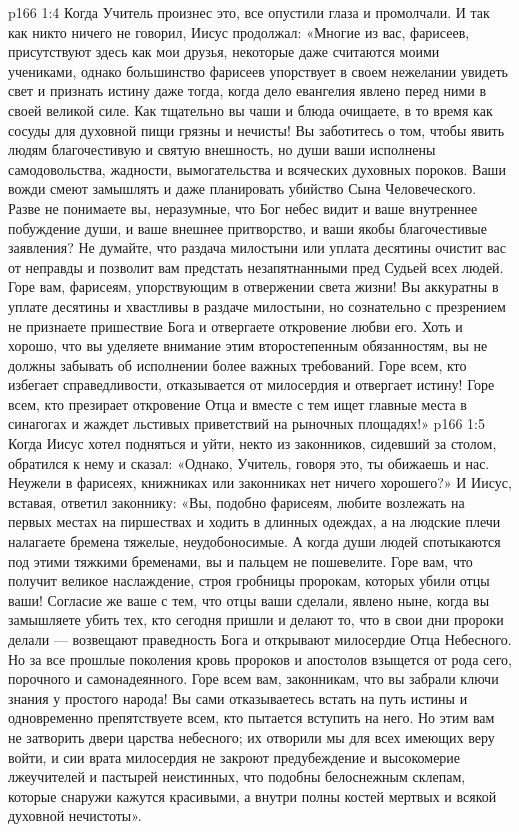 \vs p166 1:4 Когда Учитель произнес это, все опустили глаза и промолчали. И так как никто ничего не говорил, Иисус продолжал: «Многие из вас, фарисеев, присутствуют здесь как мои друзья, некоторые даже считаются моими учениками, однако большинство фарисеев упорствует в своем нежелании увидеть свет и признать истину даже тогда, когда дело евангелия явлено перед ними в своей великой силе. Как тщательно вы чаши и блюда очищаете, в то время как сосуды для духовной пищи грязны и нечисты! Вы заботитесь о том, чтобы явить людям благочестивую и святую внешность, но души ваши исполнены самодовольства, жадности, вымогательства и всяческих духовных пороков. Ваши вожди смеют замышлять и даже планировать убийство Сына Человеческого. Разве не понимаете вы, неразумные, что Бог небес видит и ваше внутреннее побуждение души, и ваше внешнее притворство, и ваши якобы благочестивые заявления? Не думайте, что раздача милостыни или уплата десятины очистит вас от неправды и позволит вам предстать незапятнанными пред Судьей всех людей. Горе вам, фарисеям, упорствующим в отвержении света жизни! Вы аккуратны в уплате десятины и хвастливы в раздаче милостыни, но сознательно с презрением не признаете пришествие Бога и отвергаете откровение любви его. Хоть и хорошо, что вы уделяете внимание этим второстепенным обязанностям, вы не должны забывать об исполнении более важных требований. Горе всем, кто избегает справедливости, отказывается от милосердия и отвергает истину! Горе всем, кто презирает откровение Отца и вместе с тем ищет главные места в синагогах и жаждет льстивых приветствий на рыночных площадях!»
\vs p166 1:5 \pc Когда Иисус хотел подняться и уйти, некто из законников, сидевший за столом, обратился к нему и сказал: «Однако, Учитель, говоря это, ты обижаешь и нас. Неужели в фарисеях, книжниках или законниках нет ничего хорошего?» И Иисус, вставая, ответил законнику: «Вы, подобно фарисеям, любите возлежать на первых местах на пиршествах и ходить в длинных одеждах, а на людские плечи налагаете бремена тяжелые, неудобоносимые. А когда души людей спотыкаются под этими тяжкими бременами, вы и пальцем не пошевелите. Горе вам, что получит великое наслаждение, строя гробницы пророкам, которых убили отцы ваши! Согласие же ваше с тем, что отцы ваши сделали, явлено ныне, когда вы замышляете убить тех, кто сегодня пришли и делают то, что в свои дни пророки делали --- возвещают праведность Бога и открывают милосердие Отца Небесного. Но за все прошлые поколения кровь пророков и апостолов взыщется от рода сего, порочного и самонадеянного. Горе всем вам, законникам, что вы забрали ключи знания у простого народа! Вы сами отказываетесь встать на путь истины и одновременно препятствуете всем, кто пытается вступить на него. Но этим вам не затворить двери царства небесного; их отворили мы для всех имеющих веру войти, и сии врата милосердия не закроют предубеждение и высокомерие лжеучителей и пастырей неистинных, что подобны белоснежным склепам, которые снаружи кажутся красивыми, а внутри полны костей мертвых и всякой духовной нечистоты».
